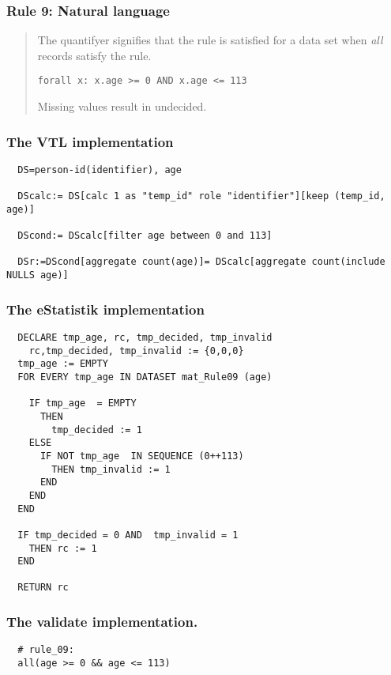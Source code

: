 \subsubsection*{  Rule 9: Natural language}
\begin{quote}


The  quantifyer signifies that the rule is satisfied for a data set when \emph{all} records satisfy the rule.

\begin{verbatim}
forall x: x.age >= 0 AND x.age <= 113
\end{verbatim}

Missing values result in undecided.


\end{quote}
\subsubsection*{The VTL implementation}
\begin{verbatim}
  DS=person-id(identifier), age

  DScalc:= DS[calc 1 as "temp_id" role "identifier"][keep (temp_id, age)]

  DScond:= DScalc[filter age between 0 and 113]

  DSr:=DScond[aggregate count(age)]= DScalc[aggregate count(include NULLS age)]

\end{verbatim}
\subsubsection*{The eStatistik implementation}
\begin{verbatim}
  DECLARE tmp_age, rc, tmp_decided, tmp_invalid
    rc,tmp_decided, tmp_invalid := {0,0,0}
  tmp_age := EMPTY
  FOR EVERY tmp_age IN DATASET mat_Rule09 (age)

    IF tmp_age  = EMPTY 
      THEN
        tmp_decided := 1 
    ELSE
      IF NOT tmp_age  IN SEQUENCE (0++113)
        THEN tmp_invalid := 1  
      END
    END
  END

  IF tmp_decided = 0 AND  tmp_invalid = 1
    THEN rc := 1
  END

  RETURN rc
\end{verbatim}
\subsubsection*{The validate implementation.}
\begin{verbatim}
  # rule_09:
  all(age >= 0 && age <= 113)
\end{verbatim}


